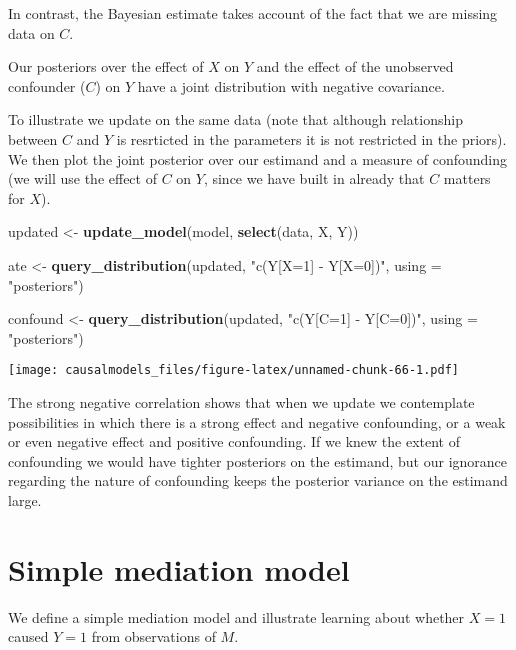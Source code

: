 \documentclass[
  12pt,
]{book}
\newenvironment{Shaded}{\begin{snugshade}}{\end{snugshade}}
\newcommand{\AttributeTok}[1]{\textcolor[rgb]{0.13,0.29,0.53}{#1}}
\newcommand{\FunctionTok}[1]{\textcolor[rgb]{0.13,0.29,0.53}{\textbf{#1}}}
\newcommand{\NormalTok}[1]{#1}
\newcommand{\OtherTok}[1]{\textcolor[rgb]{0.56,0.35,0.01}{#1}}
\newcommand{\StringTok}[1]{\textcolor[rgb]{0.31,0.60,0.02}{#1}}
\begin{document}
In contrast, the Bayesian estimate takes account of the fact that we are missing data on \(C\).

Our posteriors over the effect of \(X\) on \(Y\) and the effect of the unobserved confounder (\(C\)) on \(Y\) have a joint distribution with negative covariance.

To illustrate we update on the same data (note that although relationship between \(C\) and \(Y\) is resrticted in the parameters it is not restricted in the priors). We then plot the joint posterior over our estimand and a measure of confounding (we will use the effect of \(C\) on \(Y\), since we have built in already that \(C\) matters for \(X\)).

\begin{Shaded}
\begin{Highlighting}[]
\NormalTok{updated  }\OtherTok{\textless{}{-}} \FunctionTok{update\_model}\NormalTok{(model, }\FunctionTok{select}\NormalTok{(data, X, Y))}

\NormalTok{ate }\OtherTok{\textless{}{-}} 
  \FunctionTok{query\_distribution}\NormalTok{(updated, }\StringTok{"c(Y[X=1] {-} Y[X=0])"}\NormalTok{, }\AttributeTok{using =} \StringTok{"posteriors"}\NormalTok{)}

\NormalTok{confound }\OtherTok{\textless{}{-}} 
  \FunctionTok{query\_distribution}\NormalTok{(updated, }\StringTok{"c(Y[C=1] {-} Y[C=0])"}\NormalTok{, }\AttributeTok{using =} \StringTok{"posteriors"}\NormalTok{)}
\end{Highlighting}
\end{Shaded}

\texttt{[image: causalmodels\_files/figure-latex/unnamed-chunk-66-1.pdf]}

The strong negative correlation shows that when we update we contemplate possibilities in which there is a strong effect and negative confounding, or a weak or even negative effect and positive confounding. If we knew the extent of confounding we would have tighter posteriors on the estimand, but our ignorance regarding the nature of confounding keeps the posterior variance on the estimand large.

\hypertarget{simple-mediation-model}{%
\section{Simple mediation model}\label{simple-mediation-model}}

We define a simple mediation model and illustrate learning about whether \(X=1\) caused \(Y=1\) from observations of \(M\).
\end{document}
